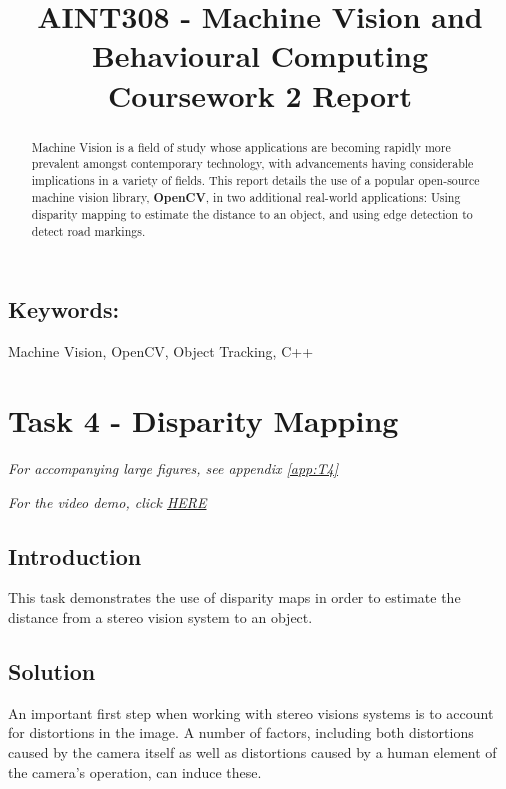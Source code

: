 \documentclass[conference]{IEEEtran}
\begin{document}
%
\title{AINT308 - Machine Vision and Behavioural Computing\\Coursework 2 Report}


\author{
}



\maketitle


\begin{abstract}
 Machine Vision is a field of study whose applications are becoming rapidly more prevalent amongst contemporary technology, with advancements having considerable implications in a variety of fields. This report details the use of a popular open-source machine vision library, \textbf{OpenCV}, in two additional real-world applications: Using disparity mapping to estimate the distance to an object, and using edge detection to detect road markings.
\end{abstract}
\subsection*{Keywords:}
Machine Vision, OpenCV, Object Tracking, C++

\section{Task 4 - Disparity Mapping}
\textit{For accompanying large figures, see appendix \ref{app:T4}}

\textit{For the video demo, click \href{https://youtu.be/d2Wa1JnRzoY}{HERE}}
\subsection{Introduction}
This task demonstrates the use of disparity maps in order to estimate the distance from a stereo vision system to an object.
\subsection{Solution}
An important first step when working with stereo visions systems is to account for distortions in the image. A number of factors, including both distortions caused by the camera itself as well as distortions caused by a human element of the camera's operation\cite{Distortions}, can induce these.
\end{document}
